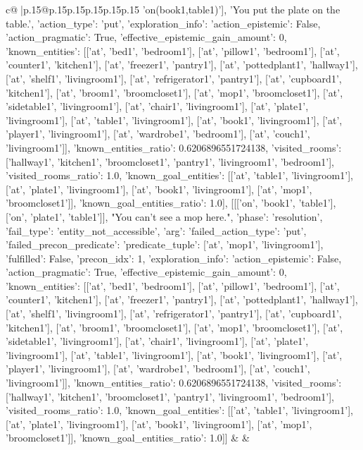 \documentclass{article}
\begin{document}
{\begin{supertabular}{c@{$\;$}|p{.15\linewidth}@{}p{.15\linewidth}p{.15\linewidth}p{.15\linewidth}p{.15\linewidth}p{.15\linewidth}}
{{{'on(book1,table1)'], 'You put the plate on the table.', {'action_type': 'put', 'exploration_info': {'action_epistemic': False, 'action_pragmatic': True, 'effective_epistemic_gain_amount': 0, 'known_entities': [['at', 'bed1', 'bedroom1'], ['at', 'pillow1', 'bedroom1'], ['at', 'counter1', 'kitchen1'], ['at', 'freezer1', 'pantry1'], ['at', 'pottedplant1', 'hallway1'], ['at', 'shelf1', 'livingroom1'], ['at', 'refrigerator1', 'pantry1'], ['at', 'cupboard1', 'kitchen1'], ['at', 'broom1', 'broomcloset1'], ['at', 'mop1', 'broomcloset1'], ['at', 'sidetable1', 'livingroom1'], ['at', 'chair1', 'livingroom1'], ['at', 'plate1', 'livingroom1'], ['at', 'table1', 'livingroom1'], ['at', 'book1', 'livingroom1'], ['at', 'player1', 'livingroom1'], ['at', 'wardrobe1', 'bedroom1'], ['at', 'couch1', 'livingroom1']], 'known_entities_ratio': 0.6206896551724138, 'visited_rooms': ['hallway1', 'kitchen1', 'broomcloset1', 'pantry1', 'livingroom1', 'bedroom1'], 'visited_rooms_ratio': 1.0, 'known_goal_entities': [['at', 'table1', 'livingroom1'], ['at', 'plate1', 'livingroom1'], ['at', 'book1', 'livingroom1'], ['at', 'mop1', 'broomcloset1']], 'known_goal_entities_ratio': 1.0}}], [[['on', 'book1', 'table1'], ['on', 'plate1', 'table1']], "You can't see a mop here.", {'phase': 'resolution', 'fail_type': 'entity_not_accessible', 'arg': {'failed_action_type': 'put', 'failed_precon_predicate': {'predicate_tuple': ['at', 'mop1', 'livingroom1'], 'fulfilled': False, 'precon_idx': 1}}, 'exploration_info': {'action_epistemic': False, 'action_pragmatic': True, 'effective_epistemic_gain_amount': 0, 'known_entities': [['at', 'bed1', 'bedroom1'], ['at', 'pillow1', 'bedroom1'], ['at', 'counter1', 'kitchen1'], ['at', 'freezer1', 'pantry1'], ['at', 'pottedplant1', 'hallway1'], ['at', 'shelf1', 'livingroom1'], ['at', 'refrigerator1', 'pantry1'], ['at', 'cupboard1', 'kitchen1'], ['at', 'broom1', 'broomcloset1'], ['at', 'mop1', 'broomcloset1'], ['at', 'sidetable1', 'livingroom1'], ['at', 'chair1', 'livingroom1'], ['at', 'plate1', 'livingroom1'], ['at', 'table1', 'livingroom1'], ['at', 'book1', 'livingroom1'], ['at', 'player1', 'livingroom1'], ['at', 'wardrobe1', 'bedroom1'], ['at', 'couch1', 'livingroom1']], 'known_entities_ratio': 0.6206896551724138, 'visited_rooms': ['hallway1', 'kitchen1', 'broomcloset1', 'pantry1', 'livingroom1', 'bedroom1'], 'visited_rooms_ratio': 1.0, 'known_goal_entities': [['at', 'table1', 'livingroom1'], ['at', 'plate1', 'livingroom1'], ['at', 'book1', 'livingroom1'], ['at', 'mop1', 'broomcloset1']], 'known_goal_entities_ratio': 1.0}}]] 
	  } 
	   } 
	   } 
	 & & \\ 
 


\end{supertabular}}
\end{document}
